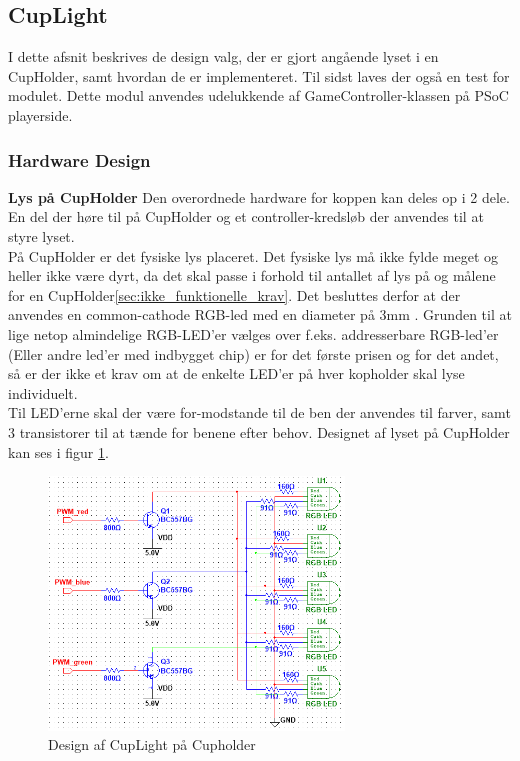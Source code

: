 \documentclass[Rapport/Rapport_main.tex]{subfiles}
\begin{document}
\subsection{CupLight}\label{sec:rap_cup_light}
I dette afsnit beskrives de design valg, der er gjort angående lyset i en CupHolder, samt hvordan de er implementeret. Til sidst laves der også en test for modulet. Dette modul anvendes udelukkende af GameController-klassen på PSoC playerside.
\subsubsection{Hardware Design}
\textbf{Lys på CupHolder}
Den overordnede hardware for koppen kan deles op i 2 dele. En del der høre til på CupHolder og et controller-kredsløb der anvendes til at styre lyset.\\
På CupHolder er det fysiske lys placeret. Det fysiske lys må ikke fylde meget og heller ikke være dyrt, da det skal passe i forhold til antallet af lys på og målene for en CupHolder\ref{sec:ikke_funktionelle_krav}. Det besluttes derfor at der anvendes en common-cathode RGB-led med en diameter på 3mm \cite{Dimensions2015RGB_Led_Datasheet}. Grunden til at lige netop almindelige RGB-LED'er vælges over f.eks. addresserbare RGB-led'er (Eller andre led'er med indbygget chip) er for det første prisen og for det andet, så er der ikke et krav om at de enkelte LED'er på hver kopholder skal lyse individuelt.\\
Til LED'erne skal der være for-modstande til de ben der anvendes til farver, samt 3 transistorer til at tænde for benene efter behov. Designet af lyset på CupHolder kan ses i figur \ref{fig:rap_cupholder_light}.
\begin{figure}[H]
    \centering
    \includegraphics[width=0.7\textwidth]{HardwareDesign/CupLight/graphics/CupHolder_HW.png}
    \caption{Design af CupLight på Cupholder}
    \label{fig:rap_cupholder_light}
\end{figure}
\end{document}
